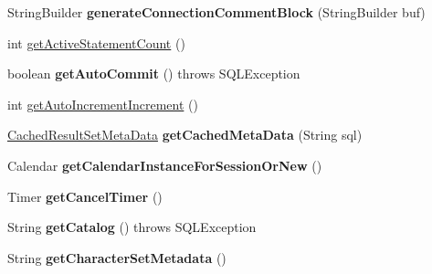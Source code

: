\begin{DoxyCompactItemize}
String\+Builder {\bfseries generate\+Connection\+Comment\+Block} (String\+Builder buf)
\item 
int \mbox{\hyperlink{classcom_1_1mysql_1_1jdbc_1_1_multi_host_my_s_q_l_connection_a88b613d50112e08095b5f72017b4deea}{get\+Active\+Statement\+Count}} ()
\item 
\mbox{\label{classcom_1_1mysql_1_1jdbc_1_1_multi_host_my_s_q_l_connection_aeb8cc693ce685ec025da265e5641a3b9}} 
boolean {\bfseries get\+Auto\+Commit} ()  throws S\+Q\+L\+Exception 
\item 
int \mbox{\hyperlink{classcom_1_1mysql_1_1jdbc_1_1_multi_host_my_s_q_l_connection_a4b95550806cfbdb36263ec1e37a5c971}{get\+Auto\+Increment\+Increment}} ()
\item 
\mbox{\label{classcom_1_1mysql_1_1jdbc_1_1_multi_host_my_s_q_l_connection_adb26aba01e55a1715cada84ec2c0d014}} 
\mbox{\hyperlink{classcom_1_1mysql_1_1jdbc_1_1_cached_result_set_meta_data}{Cached\+Result\+Set\+Meta\+Data}} {\bfseries get\+Cached\+Meta\+Data} (String sql)
\item 
\mbox{\label{classcom_1_1mysql_1_1jdbc_1_1_multi_host_my_s_q_l_connection_af98a007a2c46692cc599078586f59664}} 
Calendar {\bfseries get\+Calendar\+Instance\+For\+Session\+Or\+New} ()
\item 
\mbox{\label{classcom_1_1mysql_1_1jdbc_1_1_multi_host_my_s_q_l_connection_a31471cdae0759b31ee0d4eefbd60c19d}} 
Timer {\bfseries get\+Cancel\+Timer} ()
\item 
\mbox{\label{classcom_1_1mysql_1_1jdbc_1_1_multi_host_my_s_q_l_connection_a0189af536376c3609b58b7f792d15ea3}} 
String {\bfseries get\+Catalog} ()  throws S\+Q\+L\+Exception 
\item 
\mbox{\label{classcom_1_1mysql_1_1jdbc_1_1_multi_host_my_s_q_l_connection_a24da9a69134bc8d2d63b2b1c5be58c60}} 
String {\bfseries get\+Character\+Set\+Metadata} ()
\item 
\mbox{\label{classcom_1_1mysql_1_1jdbc_1_1_multi_host_my_s_q_l_connection_acdff9df2fe5f2cbc844d00256f4a4752}} 

\end{DoxyCompactItemize}
